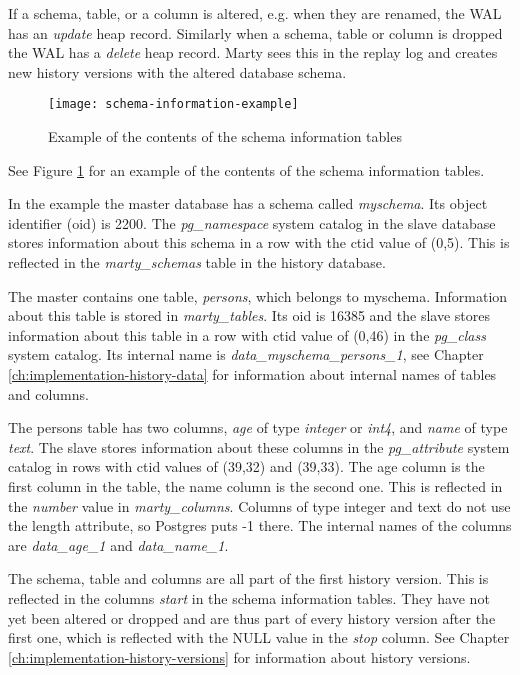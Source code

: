 If a schema, table, or a column is altered, e.g. when they are renamed, the WAL has an \textit{update} heap record.
Similarly when a schema, table or column is dropped the WAL has a \textit{delete} heap record.
Marty sees this in the replay log and creates new history versions with the altered database schema.

\begin{figure}[h!]
  \centering
    \texttt{[image: schema-information-example]}
  \caption{Example of the contents of the schema information tables}
  \label{fig:schema-information-example}
\end{figure}

See Figure \ref{fig:schema-information-example} for an example of the contents of the schema information tables.

In the example the master database has a schema called \textit{myschema}.
Its object identifier (oid) is 2200.
The \textit{pg\_namespace} system catalog in the slave database stores information about this schema in a row with the ctid value of (0,5).
This is reflected in the \textit{marty\_schemas} table in the history database.

The master contains one table, \textit{persons}, which belongs to myschema.
Information about this table is stored in \textit{marty\_tables}.
Its oid is 16385 and the slave stores information about this table in a row with ctid value of (0,46) in the \textit{pg\_class} system catalog.
Its internal name is \textit{data\_myschema\_persons\_1}, see Chapter \ref{ch:implementation-history-data} for information about internal names of tables and columns.

The persons table has two columns, \textit{age} of type \textit{integer} or \textit{int4}, and \textit{name} of type \textit{text}.
The slave stores information about these columns in the \textit{pg\_attribute} system catalog in rows with ctid values of (39,32) and (39,33).
The age column is the first column in the table, the name column is the second one.
This is reflected in the \textit{number} value in \textit{marty\_columns}.
Columns of type integer and text do not use the length attribute, so Postgres puts -1 there.
The internal names of the columns are \textit{data\_age\_1} and \textit{data\_name\_1}.

The schema, table and columns are all part of the first history version.
This is reflected in the columns \textit{start} in the schema information tables.
They have not yet been altered or dropped and are thus part of every history version after the first one, which is reflected with the NULL value in the \textit{stop} column.
See Chapter \ref{ch:implementation-history-versions} for information about history versions.
